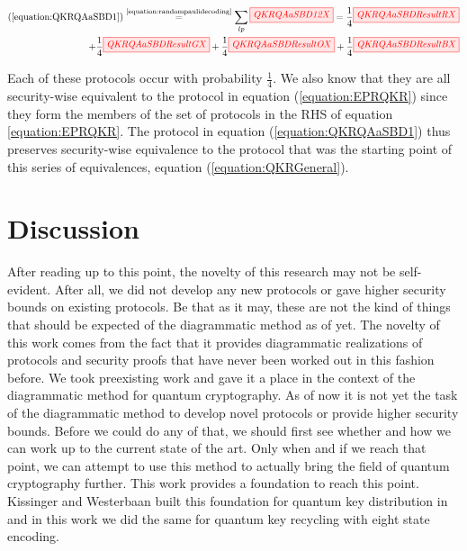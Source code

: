 \documentclass[]{article}
\newcommand{\equaltext}[1]{\ensuremath{\stackrel{\text{#1}}{=}}}
\begin{document}
\begin{equation}
	\label{equation:QKRQAaSBDResult}
	\begin{aligned}
	(\ref{equation:QKRQAaSBD1}) \equaltext{\ref{equation:randompaulidecoding}}
	\sum\limits_{lp}\tikzfig{QKRQAaSBD12X} 
	=
	 \frac{1}{4}\tikzfig{QKRQAaSBDResultRX} \\+
	\frac{1}{4}\tikzfig{QKRQAaSBDResultGX} +
	\frac{1}{4}\tikzfig{QKRQAaSBDResultOX} +
	\frac{1}{4}\tikzfig{QKRQAaSBDResultBX}
	\end{aligned}
\end{equation}

Each of these protocols occur with probability $\frac{1}{4}$. We also know that they are all security-wise equivalent to the protocol in equation (\ref{equation:EPRQKR}) since they form the members of the set of protocols in the RHS of equation \ref{equation:EPRQKR}. The protocol in equation (\ref{equation:QKRQAaSBD1}) thus preserves security-wise equivalence to the protocol that was the starting point of this series of equivalences, equation (\ref{equation:QKRGeneral}).

\section{Discussion}





After reading up to this point, the novelty of this research may not be self-evident. After all, we did not develop any new protocols or gave higher security bounds on existing protocols. Be that as it may, these are not the kind of things that should be expected of the diagrammatic method as of yet. The novelty of this work comes from the fact that it provides diagrammatic realizations of protocols and security proofs that have never been worked out in this fashion before. We took preexisting work and gave it a place in the context of the diagrammatic method for quantum cryptography. As of now it is not yet the task of the diagrammatic method to develop novel protocols or provide higher security bounds. Before we could do any of that, we should first see whether and how we can work up to the current state of the art. Only when and if we reach that point, we can attempt to use this method to actually bring the field of quantum cryptography further. This work provides a foundation to reach this point. Kissinger and Westerbaan built this foundation for quantum key distribution in \cite{Kissinger2017} and in this work we did the same for quantum key recycling with eight state encoding.
\end{document}
